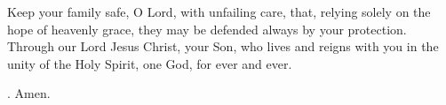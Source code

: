 \lettrine[lines=3]{K}{}eep your family safe, O Lord, with unfailing care, 
that, relying solely on the hope of heavenly grace,
they may be defended always by your protection.
Through our Lord Jesus Christ, your Son,
who lives and reigns with you in the unity of the Holy Spirit,
one God, for ever and ever. \par \Rbar. Amen.
